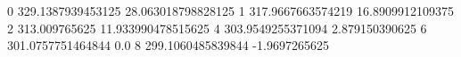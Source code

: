 0 329.1387939453125 28.063018798828125
1 317.9667663574219 16.8909912109375
2 313.009765625 11.933990478515625
4 303.9549255371094 2.879150390625
6 301.0757751464844 0.0
8 299.1060485839844 -1.9697265625
